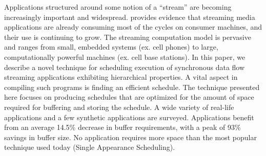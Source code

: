 

Applications structured around some notion of a ``stream'' are
becoming increasingly important and widespread. \cite{Rix98} provides
evidence that streaming media applications are already consuming most
of the cycles on consumer machines, and their use is continuing to
grow. The streaming computation model is pervasive and ranges from
small, embedded systems (ex. cell phones) to large, computationally
powerful machines (ex. cell base stations). In this paper, we describe
a novel technique for scheduling execution of synchronous data flow
streaming applications exhibiting hierarchical properties. A vital
aspect in compiling such programs is finding an efficient
schedule. The technique presented here focuses on producing schedules
that are optimized for the amount of space required for buffering and
storing the schedule. A wide variety of real-life applications and a
few synthetic applications are surveyed. Applications benefit from an
average 14.5\% decrease in buffer requirements, with a peak of 93\%
savings in buffer size. No application requires more space than the
most popular technique used today (Single Appearance Scheduling).
